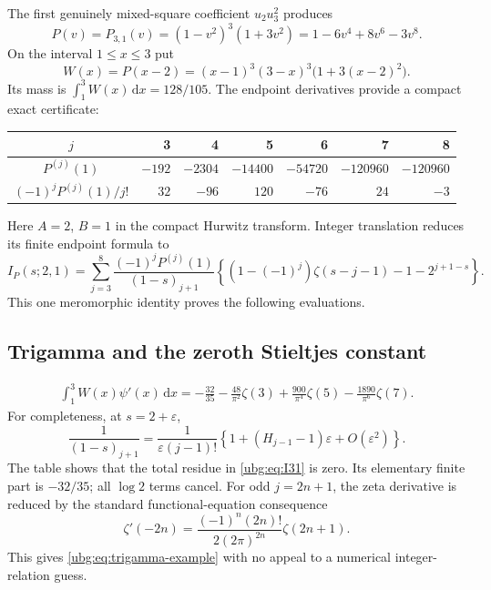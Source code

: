 \documentclass[11pt,letterpaper]{article}
\numberwithin{equation}{section}
\theoremstyle{definition}\newtheorem{definition}[theorem]{Definition}
\theoremstyle{remark}\newtheorem{remark}[theorem]{Remark}
\newcommand{\dd}{\,\mathrm d}\newcommand{\ii}{\mathrm i}
\begin{document}
The first genuinely mixed-square coefficient $u_2u_3^2$ produces
\begin{equation}\label{ubg:eq:P31}
 P(v)=P_{3,1}(v)=(1-v^2)^3(1+3v^2)
                 =1-6v^4+8v^6-3v^8.
\end{equation}
On the interval $1\le x\le3$ put
\begin{equation}\label{ubg:eq:W}
 W(x)=P(x-2)=(x-1)^3(3-x)^3\bigl(1+3(x-2)^2\bigr).
\end{equation}
Its mass is $\int_1^3W(x)\dd x=128/105$.
The endpoint derivatives provide a compact exact certificate:
\begin{center}
\small
\begin{tabular}{c r r r r r r}
\toprule
$j$&3&4&5&6&7&8\\
\midrule
$P^{(j)}(1)$&$-192$&$-2304$&$-14400$&$-54720$&$-120960$&$-120960$\\
$(-1)^jP^{(j)}(1)/j!$&$32$&$-96$&$120$&$-76$&$24$&$-3$\\
\bottomrule
\end{tabular}
\end{center}
Here $A=2$, $B=1$ in the compact Hurwitz transform. Integer translation
reduces its finite endpoint formula to
\begin{equation}\label{ubg:eq:I31}
 I_P(s;2,1)=\sum_{j=3}^8\frac{(-1)^jP^{(j)}(1)}{(1-s)_{j+1}}
   \left\{(1-(-1)^j)\zeta(s-j-1)-1-2^{j+1-s}\right\}.
\end{equation}
This one meromorphic identity proves the following evaluations.

\subsection{Trigamma and the zeroth Stieltjes constant}
\begin{align}
 \boxed{\displaystyle
 \int_1^3W(x)\psi'(x)\dd x
  =-\frac{32}{35}-\frac{48}{\pi^2}\zeta(3)
          +\frac{900}{\pi^4}\zeta(5)-\frac{1890}{\pi^6}\zeta(7).}
 \label{ubg:eq:trigamma-example}
\end{align}
For completeness, at $s=2+\varepsilon$,
\[
 \frac1{(1-s)_{j+1}}
  =\frac1{\varepsilon(j-1)!}
       \left\{1+(H_{j-1}-1)\varepsilon+O(\varepsilon^2)\right\}.
\]
The table shows that the total residue in \eqref{ubg:eq:I31} is zero.
Its elementary finite part is $-32/35$; all $\log2$ terms cancel.
For odd $j=2n+1$, the zeta derivative is reduced by the standard
functional-equation consequence \cite{DLMFintegers}
\[
 \zeta'(-2n)=\frac{(-1)^n(2n)!}{2(2\pi)^{2n}}\zeta(2n+1).
\]
This gives \eqref{ubg:eq:trigamma-example} with no appeal to a numerical
integer-relation guess.
\end{document}
